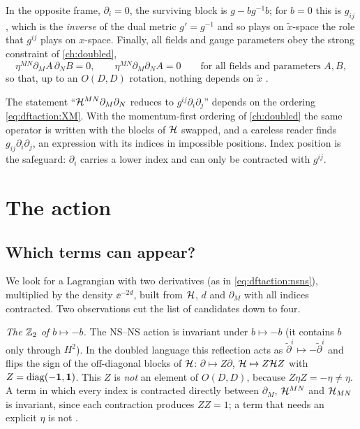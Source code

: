 In the opposite frame, $\partial_i=0$, the surviving block is $g-bg^{-1}b$; for $b=0$ this is
$g_{ij}$, which is the \emph{inverse} of the dual metric $g'=g^{-1}$ and so plays on
$\tilde x$-space the role that $g^{ij}$ plays on $x$-space. Finally, all fields and gauge parameters obey
the strong constraint of \cref{ch:doubled},
\begin{equation}\label{eq:dftaction:strong}
\eta^{MN}\partial_MA\,\partial_NB=0,\qquad \eta^{MN}\partial_M\partial_NA=0
\qquad\text{for all fields and parameters }A,B,
\end{equation}
so that, up to an $O(D,D)$ rotation, nothing depends on $\tilde x$
.

\begin{pitfallbox}
The statement ``$\mathcal{H}^{MN}\partial_M\partial_N$ reduces to $g^{ij}\partial_i\partial_j$''
depends on the ordering \eqref{eq:dftaction:XM}. With the momentum-first ordering of
\cref{ch:doubled} the same operator is written with the blocks of $\mathcal{H}$ swapped, and a
careless reader finds $g_{ij}\partial_i\partial_j$, an expression with its indices in
impossible positions. Index position is the safeguard: $\partial_i$ carries a lower index and
can only be contracted with $g^{ij}$.
\end{pitfallbox}

\section{The action}\label{sec:dftaction:action}

\subsection{Which terms can appear?}
We look for a Lagrangian with two derivatives (as in \eqref{eq:dftaction:nsns}), multiplied by
the density $\ee^{-2d}$, built from $\mathcal{H}$, $d$ and $\partial_M$ with all indices contracted. Two
observations cut the list of candidates down to four.

\emph{The $\mathbb{Z}_2$ of $b\mapsto-b$.} The NS--NS action is invariant under $b\mapsto-b$ (it
contains $b$ only through $H^2$). In the doubled language this reflection acts as
$\tilde\partial^i\mapsto-\tilde\partial^i$ and flips the sign of the off-diagonal blocks of
$\mathcal{H}$: $\partial\mapsto Z\partial$, $\mathcal{H}\mapsto Z\mathcal{H} Z$ with $Z=\operatorname{diag}(-\mathbf 1,\mathbf 1)$.
This $Z$ is \emph{not} an element of $O(D,D)$, because $Z\eta Z=-\eta\neq\eta$. A term in which
every index is contracted directly between $\partial_M$, $\mathcal{H}^{MN}$ and $\mathcal{H}_{MN}$ is invariant,
since each contraction produces $ZZ=1$; a term that needs an explicit $\eta$ is not
.

